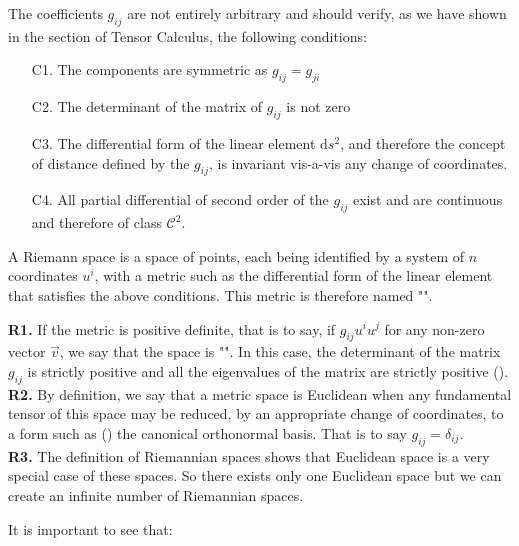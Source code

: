 	The coefficients $g_{ij}$ are not entirely arbitrary and should verify, as we have shown in the section of Tensor Calculus, the following conditions:
	\begin{enumerate}
		\item[C1.] The components are symmetric as $g_{ij}=g_{ji}$
		
		\item[C2.] The determinant of the matrix of $g_{ij}$ is not zero
		
		\item[C3.] The differential form of the linear element  $\mathrm{d}s^2$, and therefore the concept of distance defined by the $g_{ij}$, is invariant vis-a-vis any change of coordinates.
		
		\item[C4.] All partial differential of second order of the $g_{ij}$ exist and are continuous and therefore of class $\mathcal{C}^2$.
		\end{enumerate}
		A Riemann space is a space of points, each being identified by a system of $n$ coordinates $u^i$, with a metric such as the differential form of the linear element that satisfies the above conditions. This metric is therefore named "".
		
	\begin{tcolorbox}[title=Remark,colframe=black,arc=10pt]
	\textbf{R1.} If the metric is positive definite, that is to say, if $g_{ij}u^iu^j$ for any non-zero vector $\vec{v}$, we say that the space is "". In this case, the determinant of the matrix $g_{ij}$ is strictly positive and all the eigenvalues of the matrix are strictly positive ().\\
	
	\textbf{R2.} By definition, we say that a metric space is Euclidean when any fundamental tensor of this space may be reduced, by an appropriate change of coordinates, to a form such as () the canonical orthonormal basis. That is to say $g_{ij} =\delta_{ij}$.\\
	
	\textbf{R3.} The definition of Riemannian spaces shows that Euclidean space is a very special case of these spaces. So there exists only one Euclidean space but we can create an infinite number of Riemannian spaces.
	\end{tcolorbox}
	It is important to see that:
	
